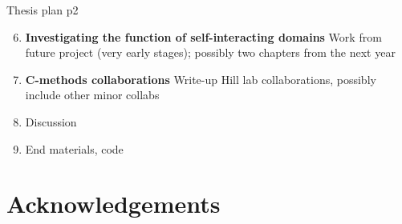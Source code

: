 \documentclass{beamer}
\begin{document}
\begin{frame}{Thesis plan p2}
\begin{enumerate}
\setcounter{enumi}{5}
\item {\bf Investigating the function of self-interacting domains}
  Work from future project (very early stages); possibly two chapters
  from the next year
\item {\bf C-methods collaborations} Write-up Hill lab collaborations,
  possibly include other minor collabs
\item Discussion
\item End materials, code
\end{enumerate}

\end{frame}


\section{Acknowledgements}
\end{document}
